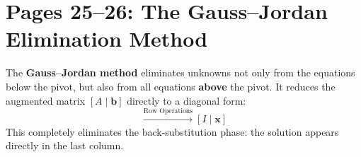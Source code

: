 \section{Pages 25--26: The Gauss--Jordan Elimination Method}
\label{sec:gauss_jordan}

\begin{theorembox}
The \textbf{Gauss--Jordan method} eliminates unknowns not only from the equations below the pivot, but also from all equations \textbf{above} the pivot. It reduces the augmented matrix $[A \mid \mathbf{b}]$ directly to a diagonal form:
\begin{equation}
    [A \mid \mathbf{b}] \xrightarrow{\text{Row Operations}} [I \mid \mathbf{x}]
\end{equation}
This completely eliminates the back-substitution phase: the solution appears directly in the last column.
\end{theorembox}

